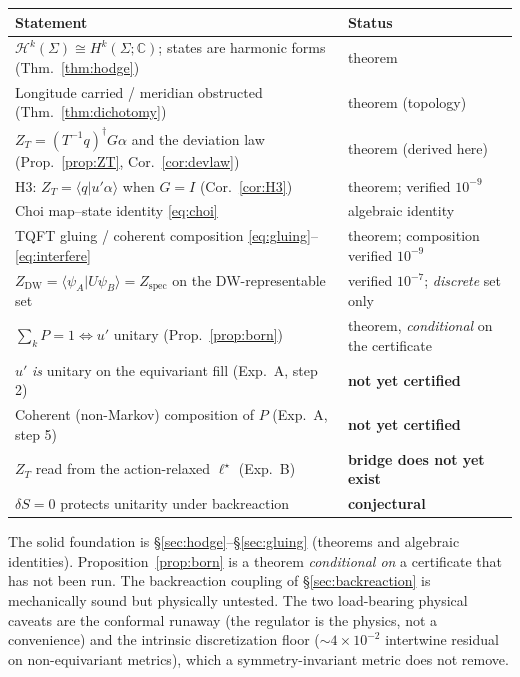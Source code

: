 \documentclass[11pt]{article}
\newcommand{\C}{\mathbb{C}}
\newcommand{\braket}[2]{\langle #1 \vert #2 \rangle}
\newcommand{\harm}{\mathcal{H}}              %
\newcommand{\ZT}{Z_{T}}
\newcommand{\Zdw}{Z_{\mathrm{DW}}}
\newcommand{\Zsp}{Z_{\mathrm{spec}}}
\theoremstyle{plain}
\theoremstyle{definition}
\begin{document}
\begin{center}
\renewcommand{\arraystretch}{1.25}
\begin{tabular}{@{}p{} l@{}}
\toprule
\textbf{Statement} & \textbf{Status} \\
\midrule
$\harm^k(\Sigma)\cong H^k(\Sigma;\C)$; states are harmonic forms (Thm.~\ref{thm:hodge}) & theorem \\
Longitude carried / meridian obstructed (Thm.~\ref{thm:dichotomy}) & theorem (topology) \\
$\ZT=(T^{-1}q)^\dagger G\alpha$ and the deviation law (Prop.~\ref{prop:ZT}, Cor.~\ref{cor:devlaw}) & theorem (derived here) \\
H3: $\ZT=\braket{q}{u'\alpha}$ when $G=I$ (Cor.~\ref{cor:H3}) & theorem; verified $10^{-9}$ \\
Choi map--state identity \eqref{eq:choi} & algebraic identity \\
TQFT gluing / coherent composition \eqref{eq:gluing}--\eqref{eq:interfere} & theorem; composition verified $10^{-9}$ \\
$\Zdw=\braket{\psi_A}{U\psi_B}=\Zsp$ on the DW-representable set & verified $10^{-7}$; \emph{discrete} set only \\
$\sum_k P=1 \Leftrightarrow u'$ unitary (Prop.~\ref{prop:born}) & theorem, \emph{conditional} on the certificate \\
$u'$ \emph{is} unitary on the equivariant fill (Exp.~A, step 2) & \textbf{not yet certified} \\
Coherent (non-Markov) composition of $P$ (Exp.~A, step 5) & \textbf{not yet certified} \\
$\ZT$ read from the action-relaxed $\ell^\star$ (Exp.~B) & \textbf{bridge does not yet exist} \\
$\delta S=0$ protects unitarity under backreaction & \textbf{conjectural} \\
\bottomrule
\end{tabular}
\end{center}

\medskip
\noindent
The solid foundation is \S\ref{sec:hodge}--\S\ref{sec:gluing} (theorems and algebraic
identities). Proposition~\ref{prop:born} is a theorem \emph{conditional on} a certificate that
has not been run. The backreaction coupling of \S\ref{sec:backreaction} is mechanically sound
but physically untested. The two load-bearing physical caveats are the conformal runaway (the
regulator is the physics, not a convenience) and the intrinsic discretization floor
($\sim 4\times10^{-2}$ intertwine residual on non-equivariant metrics), which a
symmetry-invariant metric does not remove.
\end{document}
